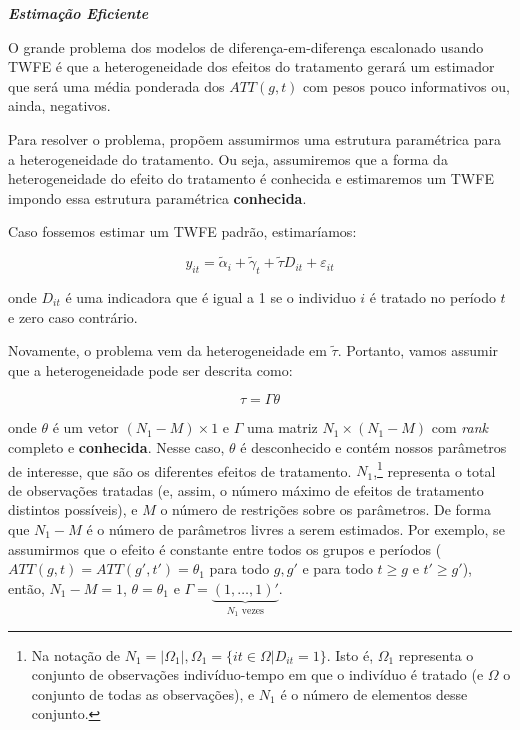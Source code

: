 \documentclass[portugues]{article}
\begin{document}
\vspace{5mm}

{\large \textbf{\textit{Estimação Eficiente}}}

\vspace{2.5mm}

O grande problema dos modelos de diferença-em-diferença escalonado usando TWFE é que a heterogeneidade dos efeitos do tratamento gerará um estimador que será uma média ponderada dos $ATT(g,t)$ com pesos pouco informativos ou, ainda, negativos.

Para resolver o problema, \cite{borusyak2024revisiting} propõem assumirmos uma estrutura paramétrica para a heterogeneidade do tratamento. Ou seja, assumiremos que a forma da heterogeneidade do efeito do tratamento é conhecida e estimaremos um TWFE impondo essa estrutura paramétrica \textbf{conhecida}. 

Caso fossemos estimar um TWFE padrão, estimaríamos:

$$ y_{it} = \tilde{\alpha}_i + \tilde{\gamma}_t + \tilde{\tau} D_{it} + \varepsilon_{it} $$

\noindent onde $D_{it}$ é uma indicadora que é igual a 1 se o individuo $i$ é tratado no período $t$ e zero caso contrário. 

Novamente, o problema vem da heterogeneidade em $\tilde{\tau}$. Portanto, vamos assumir que a heterogeneidade pode ser descrita como:

$$ \tau = \Gamma\theta$$

\noindent onde $\theta$ é um vetor $(N_1 - M) \times 1$ e $\Gamma$ uma matriz $N_1 \times (N_1 - M)$ com \textit{rank} completo e \textbf{conhecida}. Nesse caso, $\theta$ é desconhecido e contém nossos parâmetros de interesse, que são os diferentes efeitos de tratamento. $N_1$,\footnote{Na notação de \cite{borusyak2024revisiting} $N_1 = |\Omega_1|, \Omega_1 = \{ it \in \Omega | D_{it} = 1\} $. Isto é, $\Omega_1$ representa o conjunto de observações indivíduo-tempo em que o indivíduo é tratado (e $\Omega$ o conjunto de todas as observações), e $N_1$ é o número de elementos desse conjunto.} representa o total de observações tratadas (e, assim, o número máximo de efeitos de tratamento distintos possíveis), e $M$ o número de restrições sobre os parâmetros. De forma que $N_1 - M$ é o número de parâmetros livres a serem estimados. Por exemplo, se assumirmos que o efeito é constante entre todos os grupos e períodos ($ATT(g,t) = ATT(g',t') = \theta_1$ para todo $g, g'$ e para todo $t \geq g$ e $t' \geq g'$), então, $N_1 - M = 1$, $\theta = \theta_1$ e $\Gamma = \underbrace{(1, \dots, 1)'}_{N_1\text{ vezes}}$.
\end{document}
